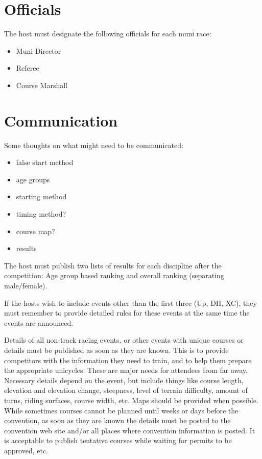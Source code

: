 \section{Officials}

The host must designate the following officials for each muni race:
\begin{itemize}
\item Muni Director
\item Referee
\item Course Marshall
\end{itemize}

\section{Communication}

\begin{comment-2016}
Some thoughts on what might need to be communicated:
\begin{itemize}
\item false start method
\item age groups
\item starting method
\item timing method?
\item course map?
\item results
\end{itemize}
\end{comment-2016}

The host must publish two lists of results for each discipline after the competition: Age group based ranking and overall ranking (separating
male/female).

If the hosts wish to include events other than the first three (Up, DH, XC), they must remember to provide detailed rules for these events at the same time the events are announced.

Details of all non-track racing events, or other events with unique courses or details must be published as soon as they are known. 
This is to provide competitors with the information they need to train, and to help them prepare the appropriate unicycles.
These are major needs for attendees from far away. 
Necessary details depend on the event, but include things like course length, elevation and elevation change, steepness, level of terrain difficulty, amount of turns, riding surfaces, course width, etc.
Maps should be provided when possible. 
While sometimes courses cannot be planned until weeks or days before the convention, as soon as they are known the details must be posted to the convention web site and/or all places where convention information is posted. 
It is acceptable to publish tentative courses while waiting for permits to be approved, etc.

